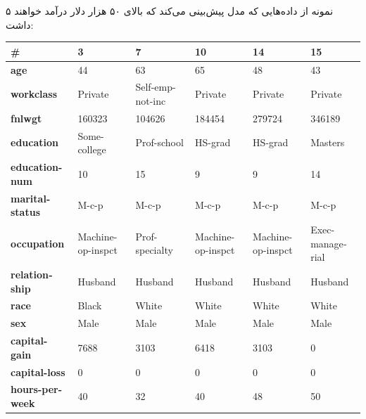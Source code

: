 \documentclass{article}
\begin{document}
\pagebreak

۵ نمونه از داده‌هایی که مدل پیش‌بینی می‌کند که بالای ۵۰ هزار دلار درآمد خواهند داشت:


\begin{latin}
\begin{table}[!hbp]
\centering
\begin{tabular}{@{}llllll@{}}
\toprule
\#                      & 3                 & 7                 & 10                & 14                & 15                \\ \midrule
\textbf{age}            & 44                & 63                & 65                & 48                & 43                \\
\textbf{workclass}      & Private           & Self-emp-not-inc  & Private           & Private           & Private           \\
\textbf{fnlwgt}         & 160323            & 104626            & 184454            & 279724            & 346189            \\
\textbf{education}      & Some-college      & Prof-school       & HS-grad           & HS-grad           & Masters           \\
\textbf{education-num}  & 10                & 15                & 9                 & 9                 & 14                \\
\textbf{marital-status} & M-c-p             & M-c-p             & M-c-p             & M-c-p             & M-c-p             \\
\textbf{occupation}     & Machine-op-inspct & Prof-specialty    & Machine-op-inspct & Machine-op-inspct & Exec-managerial   \\
\textbf{relationship}   & Husband           & Husband           & Husband           & Husband           & Husband           \\
\textbf{race}           & Black             & White             & White             & White             & White             \\
\textbf{sex}            & Male              & Male              & Male              & Male              & Male              \\
\textbf{capital-gain}   & 7688              & 3103              & 6418              & 3103              & 0                 \\
\textbf{capital-loss}   & 0                 & 0                 & 0                 & 0                 & 0                 \\
\textbf{hours-per-week} & 40                & 32                & 40                & 48                & 50                \\

\end{tabular}
\end{table}
\end{latin}
\end{document}
